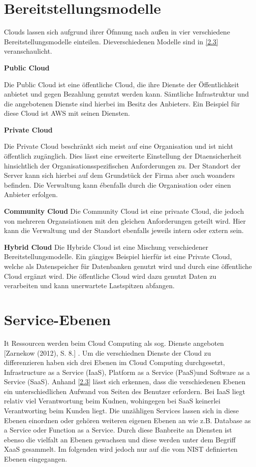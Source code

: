 \section{Bereitstellungsmodelle}
Clouds lassen sich aufgrund ihrer Öfnnung nach außen in vier verschiedene Bereitstellungsmodelle einteilen. Dieverschiedenen Modelle sind in \autoref{2.3} veranschaulicht.

\textbf{Public Cloud}

Die Public Cloud ist eine öffentliche Cloud, die ihre Dienste der Öffentlichkeit anbietet und gegen Bezahlung genutzt werden kann. Sämtliche Infrastruktur und die angebotenen Dienste sind hierbei im Besitz des Anbieters. Ein Beispiel für diese Cloud ist AWS mit seinen Diensten\cite*[]{Wirtz2022}.

\textbf{Private Cloud}

Die Private Cloud beschränkt sich meist auf eine Organisation und ist nicht öffentlich zugänglich. Dies lässt eine erweiterte Einstellung der Dtaensicherheit hinsichtlich der Organisationsspezifischen Anforderungen zu\cite*[]{Wirtz2022}. Der Standort der Server kann sich hierbei auf dem Grundstück der Firma aber auch woanders befinden. Die Verwaltung kann ébenfalls durch die Organisation oder einen Anbieter erfolgen.

\textbf{Community Cloud}
Die Community Cloud ist eine privaate Cloud, die jedoch von mehreren Organsiationen mit den gleichen Anforderungen geteilt wird. Hier kann die Verwaltung und der Standort ebenfalls jeweils intern oder extern sein.

\textbf{Hybrid Cloud}
Die Hybride Cloud ist eine Mischung verschiedener Bereitstellungsmodelle. Ein gängiges Beispiel hierfür ist eine Private Cloud, welche als Datenspeicher für Datenbanken genutzt wird und durch eine öffentliche Cloud ergänzt wird. Die öffentliche Cloud wird dazu genutzt Daten zu verarbeiten und kann unerwartete Lastspitzen abfangen.

\section{Service-Ebenen}
It Ressourcen werden beim Cloud Computing als sog. Dienste angeboten [Zarnekow (2012), S. 8.]%
. Um die verschiednen Dienste der Cloud zu differenzieren haben sich drei Ebenen im Cloud Computing durchgesetzt, Infrastructure as a Service (IaaS), Platform as a Service (PaaS)und Software as a Service (SaaS). Anhand \autoref{2.3} lässt sich erkennen, dass die verschiedenen Ebenen ein unterschiedlichen Aufwand von Seiten des Benutzer erfordern. Bei IaaS liegt relativ viel Verantwortung beim Kudnen, wohingegen bei SaaS keinerlei Verantworting beim Kunden liegt. Die unzähligen Services lassen sich in diese Ebenen einordnen oder gehören weiteren eigenen Ebenen an wie z.B. Database as a Service oder Function as a Service. Durch diese Banbreite an Diensten ist ebenso die vielfalt an Ebenen gewachsen und diese werden unter dem Begriff XaaS gesammelt. Im folgenden wird jedoch nur auf die vom NIST definierten Ebenen eingegangen.
